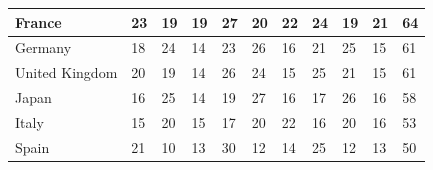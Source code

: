 \documentclass[12pt]{article}  %
\begin{document}
\begin{subappendices}
\begin{longtable}{|l|l|l|l|l|l|l|l|l|l|l|}
	\hline
	France                                                         & 23                                                & 19                                                & 19                                                & 27                                                & 20                                                & 22                                                & 24   & 19     & 21     & 64     \\ 
	\hline
	Germany                                                        & 18                                                & 24                                                & 14                                                & 23                                                & 26                                                & 16                                                & 21   & 25     & 15     & 61     \\ 
	\hline
	United Kingdom                                                 & 20                                                & 19                                                & 14                                                & 26                                                & 24                                                & 15                                                & 25   & 21     & 15     & 61     \\ 
	\hline
	Japan                                                          & 16                                                & 25                                                & 14                                                & 19                                                & 27                                                & 16                                                & 17   & 26     & 16     & 58     \\ 
	\hline
	Italy                                                          & 15                                                & 20                                                & 15                                                & 17                                                & 20                                                & 22                                                & 16   & 20     & 16     & 53     \\ 
	\hline
	Spain                                                          & 21                                                & 10                                                & 13                                                & 30                                                & 12                                                & 14                                                & 25   & 12     & 13     & 50     \\ 

\end{longtable}
\end{subappendices}
\end{document}
